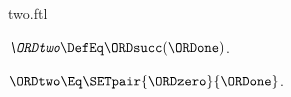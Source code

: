 \documentclass{stex}
\begin{document}
\begin{smodule}{two.ftl}

\begin{definition}[forthel,for=ORDtwo]
  $\emph{\ORDtwo} \DefEq \ORDsucc(\ORDone)$.
\end{definition}

\begin{proposition}[forthel]
  $\ORDtwo \Eq \SETpair{\ORDzero}{\ORDone}$.
\end{proposition}
\end{smodule}
\end{document}
